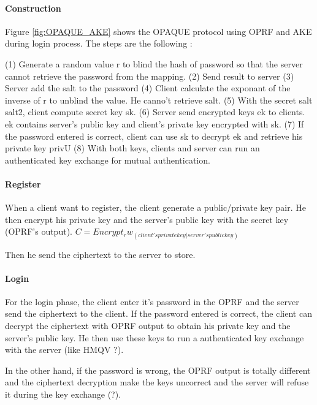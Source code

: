 \documentclass[../report.tex]{subfiles}
\begin{document}
\paragraph{Construction}

Figure \ref{fig:OPAQUE_AKE} shows the OPAQUE protocol using OPRF and AKE during login process.
The steps are the following :

(1) Generate a random value r to blind the hash of password so that the server cannot retrieve the password from the mapping.
(2) Send result to server
(3) Server add the salt to the password
(4) Client calculate the exponant of the inverse of r to unblind the value. He canno't retrieve salt.
(5) With the secret salt salt2, client compute secret key sk.
(6) Server send encrypted keys ek to clients. ek contains server's public key and client's private key encrypted with sk.
(7) If the password entered is correct, client can use sk to decrypt ek and retrieve his private key privU
(8) With both keys, clients and server can run an authenticated key exchange for mutual authentication.


\paragraph{Register}
When a client want to register, the client generate a public/private key pair. He then encrypt his private key and the server's public key with the secret key (OPRF's output).
$C = Encrypt_rw_(client's private key | server's public key)$

Then he send the ciphertext to the server to store.


\paragraph{Login}
For the login phase, the client enter it's password in the OPRF and the server send the ciphertext to the client.
If the password entered is correct, the client can decrypt the ciphertext with OPRF output to obtain his private key and the server's public key.
He then use these keys to run a authenticated key exchange with the server (like HMQV ?).

In the other hand, if the password is wrong, the OPRF output is totally different and the ciphertext decryption make the keys uncorrect and the server will refuse it during the key exchange (?). %



\end{document}
